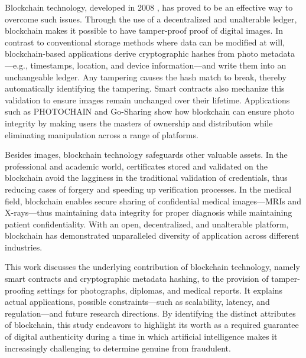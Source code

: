Blockchain technology, developed in 2008 \cite{nakamoto2008}, has proved to be an effective way
to overcome such issues. Through the use of a decentralized and unalterable ledger, blockchain
makes it possible to have tamper-proof proof of digital images. In contrast to conventional storage
methods where data can be modified at will, blockchain-based applications derive cryptographic
hashes from photo metadata---e.g., timestamps, location, and device information---and write them
into an unchangeable ledger. Any tampering causes the hash match to break, thereby automatically
identifying the tampering. Smart contracts also mechanize this validation to ensure images remain
unchanged over their lifetime. Applications such as PHOTOCHAIN and Go-Sharing show how blockchain
can ensure photo integrity by making users the masters of ownership and distribution while
eliminating manipulation across a range of platforms.

Besides images, blockchain technology safeguards other valuable assets. In the professional and
academic world, certificates stored and validated on the blockchain avoid the lagginess in the
traditional validation of credentials, thus reducing cases of forgery and speeding up verification
processes. In the medical field, blockchain enables secure sharing of confidential medical images---MRIs
and X-rays---thus maintaining data integrity for proper diagnosis while maintaining patient
confidentiality. With an open, decentralized, and unalterable platform, blockchain has demonstrated
unparalleled diversity of application across different industries.

This work discusses the underlying contribution of blockchain technology, namely smart contracts and
cryptographic metadata hashing, to the provision of tamper-proofing settings for photographs, diplomas,
and medical reports. It explains actual applications, possible constraints---such as scalability,
latency, and regulation---and future research directions. By identifying the distinct attributes of
blockchain, this study endeavors to highlight its worth as a required guarantee of digital authenticity
during a time in which artificial intelligence makes it increasingly challenging to determine genuine
from fraudulent.

